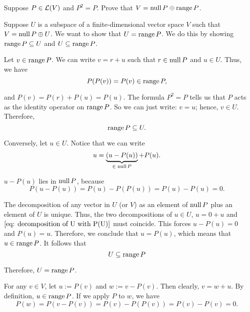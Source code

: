 \begin{xrcs}
  Suppose $P \in \mathcal{L}(V)$ and $P^2 = P$. Prove that $V= \operatorname{null} P \oplus \operatorname{range} P$.

  \begin{xprf}
    Suppose $U$ is a subspace of a finite-dimensional vector space $V$ such that $V = \operatorname{null} P \oplus U$. We want to show that $U = \operatorname{range} P$. We do this by showing $\operatorname{range} P \subseteq U$ and $U \subseteq \operatorname{range} P$.

    \StepOne Let $v \in \operatorname{range} P$. We can write $v = r+u$ such that $r \in \operatorname{null} P$ and $u \in U$. Thus, we have
    \begin{equation}
      P(P(v)) = P(v) \in \operatorname{range} P,
    \end{equation}

    and $P(v) = P(r) + P(u) = P(u)$. The formula $P^2 = P$ tells us that $P$ acts as the identity operator on $\operatorname{range} P$. So we can just write: $v = u$; hence, $v \in  U$. Therefore,
    \begin{equation}
      \operatorname{range} P \subseteq U.
    \end{equation}

    \StepTwo Conversely, let $u \in U$. Notice that we can write
    \begin{equation}
      \label{eq: decomposition of U with P(U)}
      u = \underbrace{(u-P(u))}_{\in \; \operatorname{null} P} + P(u).
    \end{equation}

    $u-P(u)$ lies in $\operatorname{null} P$, because
    \begin{equation}
      P (u-P(u)) = P(u) - P(P(u)) = P(u) - P(u) = 0.
    \end{equation}

    The decomposition of any vector in $U$ (or $V$) as an element of $\operatorname{null} P$ plus an element of $U$ is unique. Thus, the two decompositions of $u\in U$, $u=0+u$ and $\eqref{eq: decomposition of U with P(U)}$ must coincide. This forces $u-P(u) = 0$ and $P(u) = u$. Therefore, we conclude that $u=P(u)$, which means that $u \in \operatorname{range} P$. It follows that
    \begin{equation}
      U \subseteq \operatorname{range} P
    \end{equation}

    Therefore, $U = \operatorname{range} P$.

     For any $v \in V$, let $u := P(v)$ and $w := v-P(v)$. Then clearly, $v = w + u$. By definition, $u \in \operatorname{range} P$. If we apply $P$ to $w$, we have
    \begin{equation}
      P (w) = P(v-P(v)) = P(v) - P(P(v)) = P(v) - P(v) = 0.
    \end{equation}


\end{xprf}
\end{xrcs}
